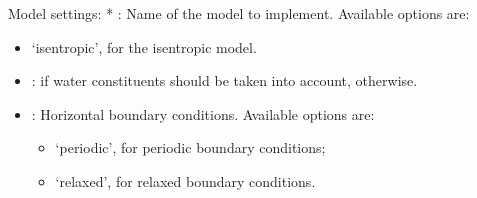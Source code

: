 \documentclass[letterpaper,10pt,english]{sphinxmanual}
\begin{document}
Model settings:
* : Name of the model to implement. Available options are:
\begin{itemize}
\item {} 
‘isentropic’, for the isentropic model.

\end{itemize}
\begin{itemize}
\item {} 
:  if water constituents should be taken into account,  otherwise.

\item {} 
: Horizontal boundary conditions. Available options are:
\begin{itemize}
\item {} 
‘periodic’, for periodic boundary conditions;

\item {} 
‘relaxed’, for relaxed boundary conditions.

\end{itemize}

\end{itemize}
\end{document}
